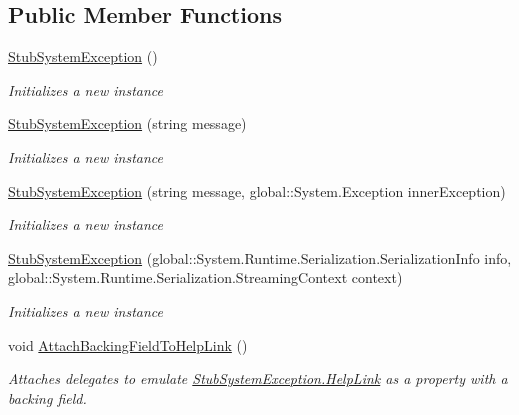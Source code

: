 \subsection*{Public Member Functions}
\begin{DoxyCompactItemize}
\item 
\hyperlink{class_system_1_1_fakes_1_1_stub_system_exception_ac9b243fcbcdad46ea2d6110250f77459}{Stub\-System\-Exception} ()
\begin{DoxyCompactList}\small\item\em Initializes a new instance\end{DoxyCompactList}\item 
\hyperlink{class_system_1_1_fakes_1_1_stub_system_exception_a6b2c26fdb880916e3f2c608678875765}{Stub\-System\-Exception} (string message)
\begin{DoxyCompactList}\small\item\em Initializes a new instance\end{DoxyCompactList}\item 
\hyperlink{class_system_1_1_fakes_1_1_stub_system_exception_ab966fd918f274a2f75fcefef916cd007}{Stub\-System\-Exception} (string message, global\-::\-System.\-Exception inner\-Exception)
\begin{DoxyCompactList}\small\item\em Initializes a new instance\end{DoxyCompactList}\item 
\hyperlink{class_system_1_1_fakes_1_1_stub_system_exception_a38b1f3edd4ad0b509d82b2827f9bc212}{Stub\-System\-Exception} (global\-::\-System.\-Runtime.\-Serialization.\-Serialization\-Info info, global\-::\-System.\-Runtime.\-Serialization.\-Streaming\-Context context)
\begin{DoxyCompactList}\small\item\em Initializes a new instance\end{DoxyCompactList}\item 
void \hyperlink{class_system_1_1_fakes_1_1_stub_system_exception_a9f2647f7908f1e05cc0c3dd81237b329}{Attach\-Backing\-Field\-To\-Help\-Link} ()
\begin{DoxyCompactList}\small\item\em Attaches delegates to emulate \hyperlink{class_system_1_1_fakes_1_1_stub_system_exception_aacbd719a6bb5e4431efc43a542f342a2}{Stub\-System\-Exception.\-Help\-Link} as a property with a backing field.\end{DoxyCompactList}\item 

\end{DoxyCompactItemize}
